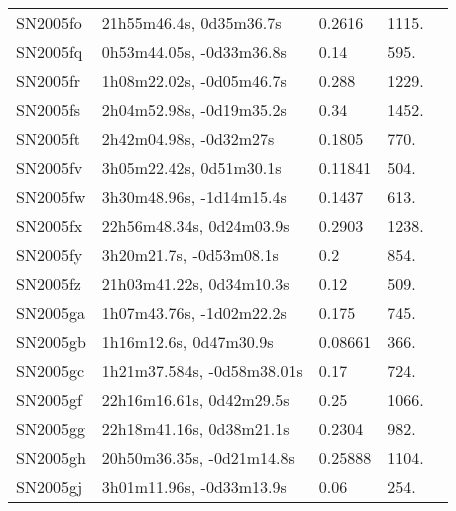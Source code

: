 \begin{longtable}{lllll}
         SN2005fo &        21h55m46.4s, 0d35m36.7s &   0.2616 &          1115. &    \citet{2011ApJ...740...92G} \\
         SN2005fq &       0h53m44.05s, -0d33m36.8s &     0.14 &           595. &    \citet{2005CBET..247A...1B} \\
         SN2005fr &       1h08m22.02s, -0d05m46.7s &    0.288 &          1229. &    \citet{2011ApJ...740...92G} \\
         SN2005fs &       2h04m52.98s, -0d19m35.2s &     0.34 &          1452. &    \citet{2011ApJ...740...92G} \\
         SN2005ft &         2h42m04.98s, -0d32m27s &   0.1805 &           770. &    \citet{2011ApJ...740...92G} \\
         SN2005fv &        3h05m22.42s, 0d51m30.1s &  0.11841 &           504. &    \citet{2003SDSS1.C...0000:} \\
         SN2005fw &       3h30m48.96s, -1d14m15.4s &   0.1437 &           613. &    \citet{2011ApJ...740...92G} \\
         SN2005fx &       22h56m48.34s, 0d24m03.9s &   0.2903 &          1238. &    \citet{2011ApJ...740...92G} \\
         SN2005fy &        3h20m21.7s, -0d53m08.1s &      0.2 &           854. &    \citet{2005CBET..247A...1B} \\
         SN2005fz &       21h03m41.22s, 0d34m10.3s &     0.12 &           509. &    \citet{2005CBET..247A...1B} \\
         SN2005ga &       1h07m43.76s, -1d02m22.2s &    0.175 &           745. &    \citet{2011ApJ...740...92G} \\
         SN2005gb &         1h16m12.6s, 0d47m30.9s &  0.08661 &           366. &    \citet{2016SDSSD.C...0000:} \\
         SN2005gc &     1h21m37.584s, -0d58m38.01s &     0.17 &           724. &    \citet{2005CBET..247A...1B} \\
         SN2005gf &       22h16m16.61s, 0d42m29.5s &     0.25 &          1066. &    \citet{2011ApJ...740...92G} \\
         SN2005gg &       22h18m41.16s, 0d38m21.1s &   0.2304 &           982. &    \citet{2011ApJ...740...92G} \\
         SN2005gh &      20h50m36.35s, -0d21m14.8s &  0.25888 &          1104. &    \citet{2004SDSS2.C...0000:} \\
         SN2005gj &       3h01m11.96s, -0d33m13.9s &     0.06 &           254. &    \citet{2005CBET..247A...1B} \\

\end{longtable}
